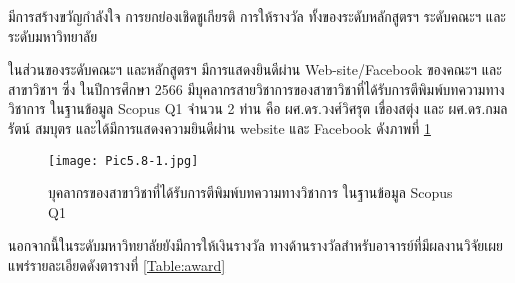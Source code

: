 มีการสร้างขวัญกำลังใจ การยกย่องเชิดชูเกียรติ การให้รางวัล ทั้งของระดับหลักสูตรฯ ระดับคณะฯ และระดับมหาวิทยาลัย 

ในส่วนของระดับคณะฯ และหลักสูตรฯ มีการแสดงยินดีผ่าน Web-site/Facebook ของคณะฯ และสาขาวิชาฯ ซึ่ง
ในปีการศึกษา 2566 มีบุคลากรสายวิชาการของสาขาวิชาที่ได้รับการตีพิมพ์บทความทางวิชาการ ในฐานข้อมูล Scopus Q1 จำนวน 2 ท่าน คือ ผศ.ดร.วงศ์วิศรุต เขื่องสตุ่ง และ ผศ.ดร.กมลรัตน์ สมบุตร และได้มีการแสดงความยินดีผ่าน website และ Facebook ดังภาพที่ \ref{Pic5.8-1}
\begin{figure}[h!]
	\texttt{[image: Pic5.8-1.jpg]}
	\caption{บุคลากรของสาขาวิชาที่ได้รับการตีพิมพ์บทความทางวิชาการ ในฐานข้อมูล Scopus Q1}
	\label{Pic5.8-1}
\end{figure}

นอกจากนี้ในระดับมหาวิทยาลัยยังมีการให้เงินรางวัล ทางด้านรางวัลสำหรับอาจารย์ที่มีผลงานวิจัยเผยแพร่รายละเอียดดังตารางที่ \ref{Table:award}
